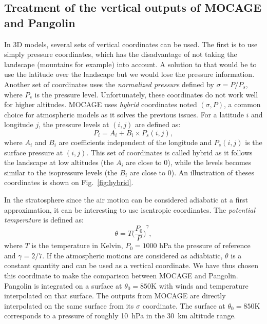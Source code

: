 \subsection{Treatment of the vertical outputs of MOCAGE  and Pangolin}
\label{subsec:vertical}
In 3D models, several sets of vertical coordinates can be used. The first is to
use simply pressure coordinates, which has the disadvantage of not taking the
landscape (mountains for example) into account. A solution to that would be to
use the latitude over the landscape but we would lose the pressure
information. Another set of coordinates uses the \textit{normalized pressure}
defined by $\sigma = P/P_s$, where $P_s$ is the pressure level. Unfortunately,
these coordinates do not work well for higher altitudes. MOCAGE uses
\textit{hybrid} coordinates noted $(\sigma,P)$, a common choice for atmospheric models as it solves
the previous issues. For a latitude $i$ and longitude $j$, the pressure levels at
$(i,j)$ are defined as:
\begin{equation*}
P_i = A_i + B_i\times P_s(i,j),
\end{equation*}
where $A_i$ and $B_i$ are coefficients independent of the longitude and
$P_s(i,j)$ is the surface pressure at $(i,j)$. This set of coordinates is called
hybrid as it follows the landscape at low altitudes (the $A_i$ are close to
$0$), while the levels becomes similar to the isopressure levels (the $B_i$ are
close to $0$). An illustration of theses coordinates is shown on Fig.~\ref{fig:hybrid}.

In the stratosphere since the air motion can be considered adiabatic at a first approximation, it can be interesting to use isentropic coordinates.
The \textit{potential temperature} is defined as:
\begin{equation}
  \theta=T{\Big(\frac{P_0}{P}\Big)}^{\gamma},
\end{equation}
where $T$ is the temperature in Kelvin, $P_0=1000$ hPa the pressure of reference
and $\gamma=2/7$. If the atmospheric motions are considered as adiabiatic,
$\theta$ is a constant quantity and can be used as a vertical coordinate.  We
have thus chosen this coordinate to make the comparison between MOCAGE and
Pangolin. Pangolin is integrated on a  surface at $\theta_0=850$K with winds and
temperature interpolated on that surface. The outputs from MOCAGE are directly
interpolated on the same surface from its $\sigma$ coordinate.  The  surface at
$\theta_0=850$K corresponds to a pressure of roughly 10~hPa in the 30~km altitude
range.

